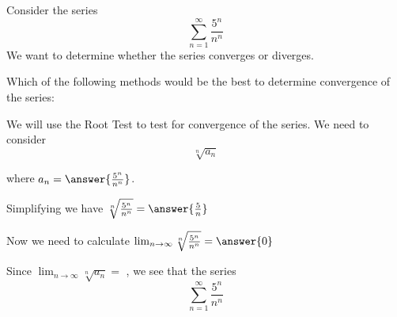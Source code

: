 \documentclass{ximera}
\author{Jason Miller}
\begin{document}
\begin{exercise}

Consider the series 
\[
\sum^{\infty}_{n=1} \frac{5^n}{n^n}
\]
We want to determine whether the series converges or diverges. 


Which of the following methods would be the best to determine convergence of the series:

\begin{multipleChoice}
\end{multipleChoice}



\begin{exercise}

We will use the Root Test to test for convergence of the series. 
We need to consider
\[
\sqrt[n]{a_n}
\]

where $a_n=\answer{ \frac{5^n}{n^n}}$. 

Simplifying we have $ \sqrt[n]{\frac{5^n}{n^n}} =\answer{ \frac{5}{n}}$



\begin{exercise}

Now we need to calculate $\lim_{n\to \infty} \sqrt[n]{\frac{5^n}{n^n}} =\answer{ 0 }$


\begin{exercise}

Since $\lim_{n \to \infty} \sqrt[n]{a_n}=$  ,
we see that the series
\[
\sum^{\infty}_{n=1} \frac{5^n}{n^n}
\]
\begin{multipleChoice}
\end{multipleChoice}


\end{exercise}

\end{exercise}
\end{exercise}
\end{exercise}
\end{document}
